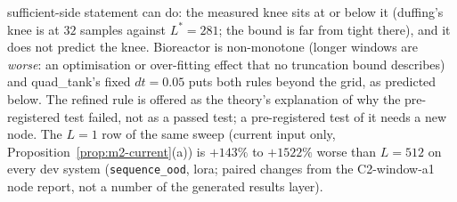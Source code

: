 sufficient-side statement can do: the measured knee sits at or below it (duffing's knee is at $32$ samples against
$L^*=281$; the bound is far from tight there), and it does not predict the knee. Bioreactor is non-monotone (longer
windows are \emph{worse}: an optimisation or over-fitting effect that no truncation bound describes) and quad\_tank's
fixed $dt=0.05$ puts both rules beyond the grid, as predicted below. The refined rule is offered as the theory's
explanation of why the pre-registered test failed, not as a passed test; a pre-registered test of it needs a new node.
The $L=1$ row of the same sweep (current input only, Proposition~\ref{prop:m2-current}(a)) is $+143\%$ to $+1522\%$ worse
than $L=512$ on every dev system (\texttt{sequence\_ood}, lora; paired changes from the C2-window-a1 node report, not a
number of the generated results layer).

